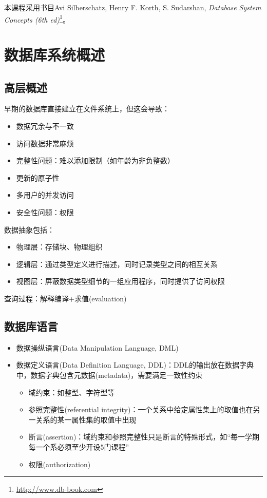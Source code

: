 
本课程采用书目Avi Silberschatz, Henry F. Korth, S. Sudarshan, \emph{Database System Concepts (6th ed)}\footnote{\url{http://www.db-book.com}}。

\section{数据库系统概述}
\subsection{高层概述}
早期的数据库直接建立在文件系统上，但这会导致：
\begin{itemize}
	\item 数据冗余与不一致
	\item 访问数据非常麻烦
	\item 完整性问题：难以添加限制（如年龄为非负整数）
	\item 更新的原子性
	\item 多用户的并发访问
	\item 安全性问题：权限
\end{itemize}

数据抽象包括：
\begin{itemize}
	\item 物理层：存储块、物理组织
	\item 逻辑层：通过类型定义进行描述，同时记录类型之间的相互关系
	\item 视图层：屏蔽数据类型细节的一组应用程序，同时提供了访问权限
\end{itemize}

查询过程：解释编译+求值(evaluation)

\subsection{数据库语言}
\begin{itemize}
\item 数据操纵语言(Data Manipulation Language, DML)
\item 数据定义语言(Data Definition Language, DDL)：DDL的输出放在数据字典中，数据字典包含元数据(metadata)，需要满足一致性约束
\begin{itemize}
	\item 域约束：如整型、字符型等
	\item 参照完整性(referential integrity)：一个关系中给定属性集上的取值也在另一关系的某一属性集的取值中出现
	\item 断言(assertion)：域约束和参照完整性只是断言的特殊形式，如“每一学期每一个系必须至少开设5门课程”
	\item 权限(authorization)
\end{itemize}
\end{itemize}

